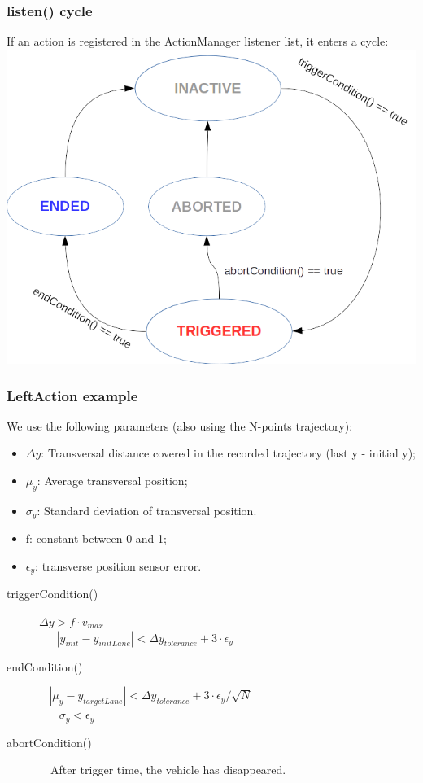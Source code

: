 \documentclass{beamer}
\begin{document}
\begin{frame}
\frametitle{listen() cycle}
If an action is registered in the ActionManager listener list, it enters a cycle:\\

\centering
\includegraphics[scale=0.4]{ListeningCycle}

\end{frame}

\begin{frame}
\frametitle{LeftAction example}

We use the following parameters (also using the N-points trajectory):
\begin{itemize}
\item $\Delta y$: Transversal distance covered in the recorded trajectory (last y - initial y);
\item $\mu_y$: Average transversal position;
\item $\sigma_y$: Standard deviation of transversal position.
\item f: constant between 0 and 1;
\item $\epsilon_y$: transverse position sensor error. 
\end{itemize}

\bigskip

\begin{description}
\item[triggerCondition()] 
$ \Delta y > f\cdot v_{max}$ \\
 $\ \ \ \ \ \ \ |y_{init} - y_{initLane}| < \Delta y_{tolerance} + 3\cdot\epsilon_y$

\item[endCondition()] 
$\ \ \ \ |\mu_y - y_{targetLane}| < \Delta y_{tolerance} + 3\cdot\epsilon_y/\sqrt{N}$ \\
$\ \ \ \ \ \ \ \ \sigma_y < \epsilon_y$

\item[abortCondition()] \ \ After trigger time, the vehicle has disappeared.
 
\end{description}
\end{frame}
\end{document}
